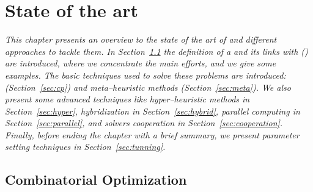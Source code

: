 \chapter{State of the art}
\label{chap:art}
\textit{This chapter presents an overview to the state of the art of \COPs{} and different approaches to tackle them. In Section~\ref{sec:combi} the definition of a \COP{} and its links with \CSPs{} (\csp) are introduced, where we concentrate the main efforts, and we give some examples. The basic techniques used to solve these problems are introduced: {\it \cp} (Section~\ref{sec:cp}) and {\it meta--heuristic methods} (Section~\ref{sec:meta}). We also present some advanced techniques like {\it hyper--heuristic methods} in Section~\ref{sec:hyper}, {\it hybridization} in Section~\ref{sec:hybrid}, {\it parallel computing} in Section~\ref{sec:parallel}, and {\it solvers cooperation} in Section~\ref{sec:cooperation}. Finally, before ending the chapter with a brief summary, we present {\it parameter setting techniques} in Section~\ref{sec:tunning}.}
\vfill
\minitoc
\newpage



\section{Combinatorial Optimization}\label{sec:combi}


